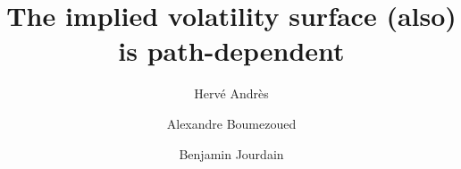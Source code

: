 \documentclass[11pt, a4paper]{article}
\theoremstyle{plain}
\theoremstyle{definition}
\theoremstyle{remark}
\numberwithin{equation}{section}
\begin{document}

\title{The implied volatility surface (also) is path-dependent}

\author[1,2]{Hervé Andrès}
\author[1]{Alexandre Boumezoued}
\author[2]{Benjamin Jourdain}
\maketitle





















\appendix
\makeatletter  
\renewcommand{\@seccntformat}[1]{Appendix \csname the#1\endcsname .\quad}
\makeatother
\renewcommand{\thesection}{\Alph{section}} 
\makeatother
% 

\end{document}

